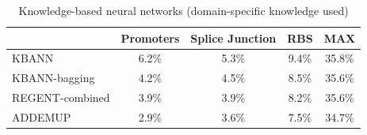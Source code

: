 \documentclass[a4paper,10pt]{article}
\begin{document}
  \begin{table}[h]\caption{Knowledge-based neural networks (domain-specific knowledge used)} \label{KnowledgeTab}
   \centering
   \begin{tabular}[h]{|l|c|c|c|c|}
    \hline
       & Promoters & Splice Junction & RBS & MAX \\ \hline
    KBANN & 6.2\% & 5.3\% & 9.4\% & 35.8\% \\ 
    KBANN-bagging & 4.2\% & 4.5\% & 8.5\% & 35.6\% \\
    REGENT-combined & 3.9\% & 3.9\% & 8.2\% & 35.6\% \\
    ADDEMUP & 2.9\% & 3.6\% & 7.5\% & 34.7\% \\ \hline
   \end{tabular}
  \end{table}
 
\end{document}
